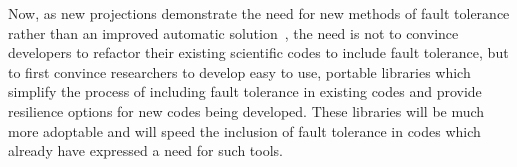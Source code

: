 Now, as new projections demonstrate the need for new methods of fault tolerance 
rather than an improved automatic solution~\cite{BosilcaINRIARep7950}, the need is not to 
convince developers to refactor their existing scientific codes to include fault 
tolerance, but to first convince researchers to develop easy to use, portable 
libraries which simplify the process of including fault tolerance in existing 
codes and provide resilience options for new codes being developed. These 
libraries will be much more adoptable and will speed the inclusion of fault 
tolerance in codes which already have expressed a need for such tools.
